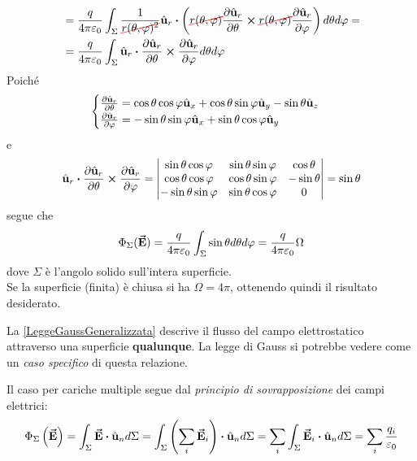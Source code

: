 \begin{demonstration}
\begin{align*}
	&=\frac{q}{4\pi\epsilon_0}\int_{\Sigma}\frac{1}{\Ccancel[red]{r(\theta,\phi)^2}}\vbh{u}_r\vdot\left(\Ccancel[red]{r(\theta,\phi)}\pdv{\vbh{u}_r}{\theta}\cross \Ccancel[red]{r(\theta,\phi)}\pdv{\vbh{u}_r}{\phi}\right)d\theta d\phi=\\
	&=\frac{q}{4\pi\epsilon_0}\int_{\Sigma}\vbh{u}_r\vdot\pdv{\vbh{u}_r}{\theta}\cross\pdv{\vbh{u}_r}{\phi}d\theta d\phi
\end{align*}
Poiché
\begin{equation*}
	\begin{cases}
		\pdv{\hat{\mathbf{u}}_r}{\theta}=\cos\theta\cos\varphi\hat{\mathbf{u}}_x+\cos\theta\sin\varphi\hat{\mathbf{u}}_y-\sin\theta\hat{\mathbf{u}}_z\\
		\pdv{\hat{\mathbf{u}}_r}{\varphi}=-\sin\theta\sin\varphi\hat{\mathbf{u}}_x+\sin\theta\cos\varphi\hat{\mathbf{u}}_y\\
\end{cases}
\end{equation*}
e
\begin{equation*}
	\vbh{u}_r\vdot\pdv{\vbh{u}_r}{\theta}\cross\pdv{\vbh{u}_r}{\phi}=\begin{vmatrix}
		\sin\theta\cos\phi & \sin\theta\sin\phi & \cos\theta\\
		\cos\theta\cos\phi & \cos\theta\sin\phi & -\sin\theta\\
		-\sin\theta\sin\phi & \sin\theta\cos\phi & 0
	\end{vmatrix}=\sin\theta
\end{equation*}
segue che
\begin{equation}
	\Phi_{\Sigma}(\vb*{\va{E}})=\frac{q}{4\pi\varepsilon_0}\int_{\Sigma}\sin\theta d\theta d\varphi=\frac{q}{4\pi\varepsilon_0}\Omega\label{LeggeGaussGeneralizzata}
\end{equation}
dove $\Sigma$ è l'angolo solido sull'intera superficie.\\
Se la superficie (finita) è chiusa si ha $\Omega=4\pi$, ottenendo quindi il risultato desiderato.
\end{demonstration}
\begin{observe}
	La \eqref{LeggeGaussGeneralizzata} descrive il flusso del campo elettrostatico attraverso una superficie \textbf{qualunque}. La legge di Gauss si potrebbe vedere come un \textit{caso specifico} di questa relazione.
\end{observe}
Il caso per cariche multiple segue dal \textit{principio di sovrapposizione} dei campi elettrici:
\begin{equation*}
	\Phi_{\Sigma}\left(\vba{E}\right)=\int_{\Sigma} \vba{E}\vdot \vbh{u}_nd\Sigma=\int_{\Sigma}\left(\sum_i\vba{E}_i\right)\vdot\vbh{u}_nd\Sigma=\sum_i\int_{\Sigma}\vba{E}_i\vdot\vbh{u}_nd\Sigma=\sum_i\frac{q_i}{\epsilon_0}
\end{equation*}
